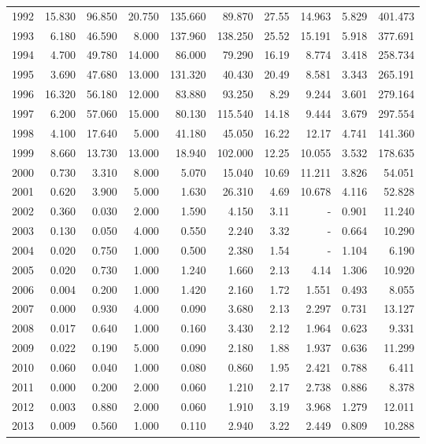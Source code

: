 \documentclass[
]{scrartcl}
\begin{document}
\begin{landscape}
\begin{longtable}{rrrrrrrrrr}
1992 & 15.830 & 96.850 & 20.750 & 135.660 & 89.870 & 27.55 & 14.963 & 5.829 & 401.473 \\ 
1993 & 6.180 & 46.590 & 8.000 & 137.960 & 138.250 & 25.52 & 15.191 & 5.918 & 377.691 \\ 
1994 & 4.700 & 49.780 & 14.000 & 86.000 & 79.290 & 16.19 & 8.774 & 3.418 & 258.734 \\ 
1995 & 3.690 & 47.680 & 13.000 & 131.320 & 40.430 & 20.49 & 8.581 & 3.343 & 265.191 \\ 
1996 & 16.320 & 56.180 & 12.000 & 83.880 & 93.250 & 8.29 & 9.244 & 3.601 & 279.164 \\ 
1997 & 6.200 & 57.060 & 15.000 & 80.130 & 115.540 & 14.18 & 9.444 & 3.679 & 297.554 \\ 
1998 & 4.100 & 17.640 & 5.000 & 41.180 & 45.050 & 16.22 & 12.17 & 4.741 & 141.360 \\ 
1999 & 8.660 & 13.730 & 13.000 & 18.940 & 102.000 & 12.25 & 10.055 & 3.532 & 178.635 \\ 
2000 & 0.730 & 3.310 & 8.000 & 5.070 & 15.040 & 10.69 & 11.211 & 3.826 & 54.051 \\ 
2001 & 0.620 & 3.900 & 5.000 & 1.630 & 26.310 & 4.69 & 10.678 & 4.116 & 52.828 \\ 
2002 & 0.360 & 0.030 & 2.000 & 1.590 & 4.150 & 3.11 &  -  & 0.901 & 11.240 \\ 
2003 & 0.130 & 0.050 & 4.000 & 0.550 & 2.240 & 3.32 &  -  & 0.664 & 10.290 \\ 
2004 & 0.020 & 0.750 & 1.000 & 0.500 & 2.380 & 1.54 &  -  & 1.104 & 6.190 \\ 
2005 & 0.020 & 0.730 & 1.000 & 1.240 & 1.660 & 2.13 & 4.14 & 1.306 & 10.920 \\ 
2006 & 0.004 & 0.200 & 1.000 & 1.420 & 2.160 & 1.72 & 1.551 & 0.493 & 8.055 \\ 
2007 & 0.000 & 0.930 & 4.000 & 0.090 & 3.680 & 2.13 & 2.297 & 0.731 & 13.127 \\ 
2008 & 0.017 & 0.640 & 1.000 & 0.160 & 3.430 & 2.12 & 1.964 & 0.623 & 9.331 \\ 
2009 & 0.022 & 0.190 & 5.000 & 0.090 & 2.180 & 1.88 & 1.937 & 0.636 & 11.299 \\ 
2010 & 0.060 & 0.040 & 1.000 & 0.080 & 0.860 & 1.95 & 2.421 & 0.788 & 6.411 \\ 
2011 & 0.000 & 0.200 & 2.000 & 0.060 & 1.210 & 2.17 & 2.738 & 0.886 & 8.378 \\ 
2012 & 0.003 & 0.880 & 2.000 & 0.060 & 1.910 & 3.19 & 3.968 & 1.279 & 12.011 \\ 
2013 & 0.009 & 0.560 & 1.000 & 0.110 & 2.940 & 3.22 & 2.449 & 0.809 & 10.288 \\ 

\end{longtable}
\end{landscape}
\end{document}
